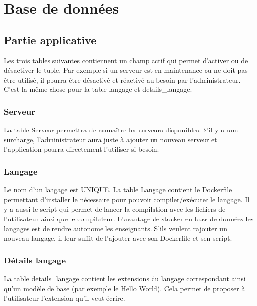 \section{Base de données}

\subsection{Partie applicative}\label{ss-partieApp}

\par Les trois tables suivantes contiennent un champ actif qui permet d’activer ou de désactiver le tuple. Par exemple si un serveur est en maintenance ou ne doit pas être utilisé, il pourra être désactivé et réactivé au besoin par l’administrateur. C’est la même chose pour la table langage et details\_langage.


\subsubsection{Serveur}

\par La table Serveur permettra de connaître les serveurs disponibles. S'il y a une surcharge, l’administrateur aura juste à ajouter un nouveau serveur et l’application pourra directement l’utiliser si besoin.

\subsubsection{Langage}

\par Le nom d’un langage est UNIQUE. La table Langage contient le Dockerfile permettant d’installer le nécessaire pour pouvoir compiler/exécuter le langage. Il y a aussi le script qui permet de lancer la compilation avec les fichiers de l’utilisateur ainsi que le compilateur. 
L’avantage de stocker en base de données les langages est de rendre autonome les enseignants. S’ils veulent rajouter un nouveau langage, il leur suffit de l’ajouter avec son Dockerfile et son script.

\subsubsection{Détails langage}

\par La table details\_langage contient les extensions du langage correspondant ainsi qu’un modèle de base (par exemple le Hello World). Cela permet de proposer à l’utilisateur l’extension qu’il veut écrire.

